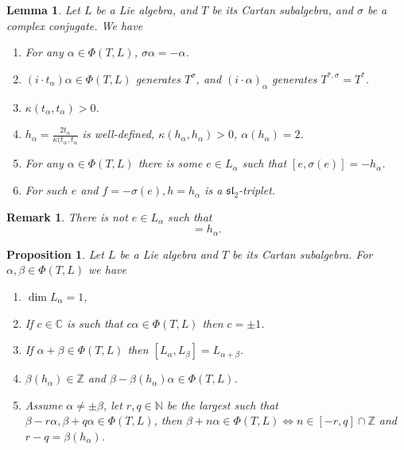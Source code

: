 \documentclass{article}
\newtheorem{proposition}{Proposition}[section]
\newtheorem{lemma}{Lemma}[section]
\newtheorem{remark}{Remark}[section]
\numberwithin{equation}{section}
\begin{document}
\begin{lemma}
Let $L$ be a Lie algebra, and $T$ be its Cartan subalgebra, and $\sigma$ be a complex conjugate. We have
\begin{enumerate}
\item For any $\alpha\in\Phi(T,L)$, $\sigma\alpha=-\alpha$.
\item $(i\cdot t_\alpha)\alpha\in\Phi(T,L)$ generates $T^\sigma$, and $(i\cdot\alpha)_\alpha$ generates $T^{*,\sigma} = T^*$.
\item $\kappa(t_\alpha,t_\alpha)>0$.
\item $h_\alpha = {\frac {2t_\alpha} {\kappa(t_\alpha,t_\alpha}}$ is well-defined, $\kappa(h_\alpha,h_\alpha)>0$, $\alpha(h_\alpha)=2$.
\item For any $\alpha\in\Phi(T,L)$ there is some $e\in L_\alpha$ such that $[e,\sigma(e)]=-h_{\alpha}$.
\item For such $e$ and $f=-\sigma(e),h=h_\alpha$ is a $\mathfrak{sl}_2$-triplet.
\end{enumerate}
\end{lemma}

\begin{remark}
There is not $e\in L_\alpha$ such that
\begin{equation*}
[e,\sigma(e)] = h_\alpha.
\end{equation*}
\end{remark}

\begin{proposition}
Let $L$ be a Lie algebra and $T$ be its Cartan subalgebra. For $\alpha,\beta\in\Phi(T,L)$ we have
\begin{enumerate}
\item $\dim L_\alpha = 1$,
\item If $c\in\mathbb{C}$ is such that $c\alpha\in \Phi(T,L)$ then $c=\pm1$.
\item If $\alpha+\beta\in\Phi(T,L)$ then $[L_\alpha,L_\beta] = L_{\alpha+\beta}$.
\item $\beta(h_\alpha)\in\mathbb{Z}$ and $\beta-\beta(h_\alpha)\alpha\in\Phi(T,L)$.
\item Assume $\alpha\not=\pm\beta$, let $r,q\in\mathbb{N}$ be the largest such that $\beta-r\alpha,\beta+q\alpha\in\Phi(T,L)$, then $\beta+n\alpha\in\Phi(T,L)\Leftrightarrow n\in[-r,q]\cap\mathbb{Z}$ and $r-q = \beta(h_\alpha)$.
\end{enumerate}
\end{proposition}
\end{document}
